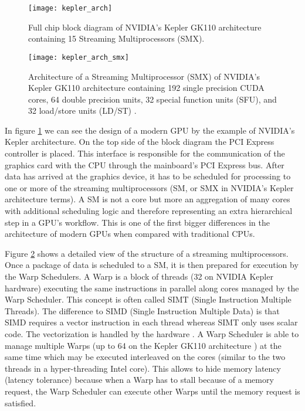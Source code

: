 \begin{figure}
\centering
\texttt{[image: kepler\_arch]}
\caption{Full chip block diagram of NVIDIA's Kepler GK110 architecture containing 15 Streaming Multiprocessors (SMX). \cite{kepler_arch}}
\label{fig:kepler_arch}
\end{figure}

\begin{figure}
\centering
\texttt{[image: kepler\_arch\_smx]}
\caption{Architecture of a Streaming Multiprocessor (SMX) of NVIDIA's Kepler GK110 architecture containing 192 single precision CUDA cores, 64 double precision units, 32 special function units (SFU), and 32 load/store units (LD/ST) \cite{kepler_arch}.}
\label{fig:kepler_arch_smx}
\end{figure}

In figure \ref{fig:kepler_arch} we can see the design of a modern GPU by the example of NVIDIA's Kepler architecture. On the top side of the block diagram the PCI Express controller is placed. This interface is responsible for the communication of the graphics card with the CPU through the mainboard's PCI Express bus. After data has arrived at the graphics device, it has to be scheduled for processing to one or more of the streaming multiprocessors (SM, or SMX in NVIDIA's Kepler architecture terms). A SM is not a core but more an aggregation of many cores with additional scheduling logic and therefore representing an extra hierarchical step in a GPU's workflow. This is one of the first bigger differences in the architecture of modern GPUs when compared with traditional CPUs.

Figure \ref{fig:kepler_arch_smx} shows a detailed view of the structure of a streaming multiprocessors. Once a package of data is scheduled to a SM, it is then prepared for execution by the Warp Schedulers. A Warp is a block of threads (32 on NVIDIA Kepler hardware) executing the same instructions in parallel along cores managed by the Warp Scheduler. This concept is often called SIMT (Single Instruction Multiple Threads). The difference to SIMD (Single Instruction Multiple Data) is that SIMD requires a vector instruction in each thread whereas SIMT only uses scalar code. The vectorization is handled by the hardware \cite[p.99]{gpu_optimizations}. A Warp Scheduler is able to manage multiple Warps (up to 64 on the Kepler GK110 architecture \cite[p.7]{kepler_arch}) at the same time which may be executed interleaved on the cores (similar to the two threads in a hyper-threading Intel core). This allows to hide memory latency (latency tolerance) because when a Warp has to stall because of a memory request, the Warp Scheduler can execute other Warps until the memory request is satisfied.

